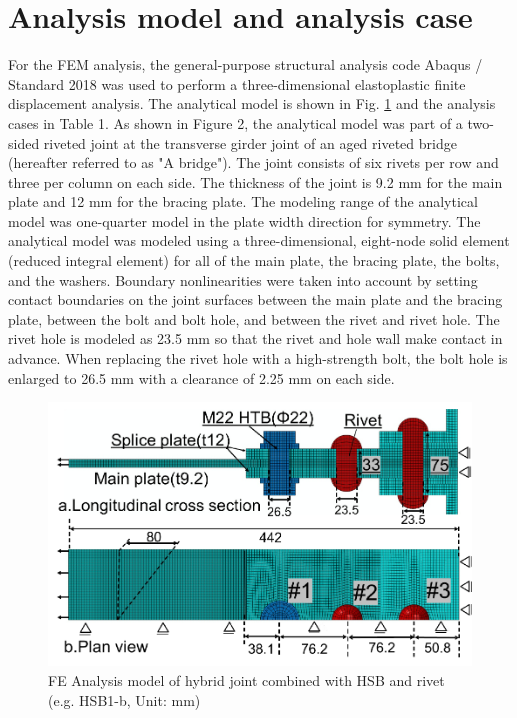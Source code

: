 \section{Analysis model and analysis case}
\label{ch4sec2}

For the FEM analysis, the general-purpose structural analysis code Abaqus / Standard 2018 \cite{Smith2020} was used to perform a three-dimensional elastoplastic finite displacement analysis. The analytical model is shown in Fig. \ref{fig-femodel-hsbrive} and the analysis cases in Table 1. As shown in Figure 2, the analytical model was part of a two-sided riveted joint at the transverse girder joint of an aged riveted bridge (hereafter referred to as "A bridge"). The joint consists of six rivets per row and three per column on each side. The thickness of the joint is 9.2 mm for the main plate and 12 mm for the bracing plate. The modeling range of the analytical model was one-quarter model in the plate width direction for symmetry. The analytical model was modeled using a three-dimensional, eight-node solid element (reduced integral element) for all of the main plate, the bracing plate, the bolts, and the washers. Boundary nonlinearities were taken into account by setting contact boundaries on the joint surfaces between the main plate and the bracing plate, between the bolt and bolt hole, and between the rivet and rivet hole. The rivet hole is modeled as 23.5 mm so that the rivet and hole wall make contact in advance. When replacing the rivet hole with a high-strength bolt, the bolt hole is enlarged to 26.5 mm with a clearance of 2.25 mm on each side.

\begin{figure}[htbp]
    \centering
    \includegraphics[width=0.75\linewidth]{imgs//ch4/femodel-hsbrive.pdf}
    \caption{FE Analysis model of hybrid joint combined with HSB and rivet (e.g. HSB1-b, Unit: mm)}
    \label{fig-femodel-hsbrive}
\end{figure}



